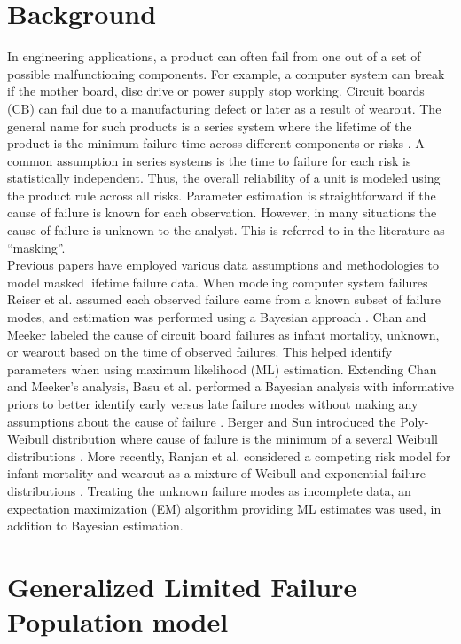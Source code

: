 \documentclass[12pt]{article}
\begin{document}
\section{Background}
\label{sec:Background}
In engineering applications, a product can often fail from one out of a set of possible malfunctioning components.  For example, a computer system can break if the mother board, disc drive or power supply stop working.  Circuit boards (CB) can fail due to a manufacturing defect or later as a result of wearout.  The general name for such products is a series system where the lifetime of the product is the minimum failure time across different components or risks \cite{nelson}.  A common assumption in series systems is the time to failure for each risk is statistically independent.  Thus, the overall reliability of a unit is modeled using the product rule across all risks.  Parameter estimation is straightforward if the cause of failure is known for each observation.  However, in many situations the cause of failure is unknown to the analyst. This is referred to in the literature as ``masking''.\\

Previous papers have employed various data assumptions and methodologies to model masked lifetime failure data.  When modeling computer system failures Reiser et al. assumed each observed failure came from a known subset of failure modes, and estimation was performed using a Bayesian approach \cite{reiser}.  Chan and Meeker labeled the cause of circuit board failures as infant mortality, unknown, or wearout based on the time of observed failures.  This helped identify parameters when using maximum likelihood (ML) estimation.  Extending Chan and Meeker's analysis, Basu et al. performed a Bayesian analysis with informative priors to better identify early versus late failure modes without making any assumptions about the cause of failure \cite{basu}.  Berger and Sun introduced the Poly-Weibull distribution where cause of failure is the minimum of a several Weibull distributions \cite{berger}.  More recently, Ranjan et al. considered a competing risk model for infant mortality and wearout as a mixture of Weibull and exponential failure distributions \cite{ranjan}.  Treating the unknown failure modes as incomplete data, an expectation maximization (EM) algorithm providing ML estimates was used, in addition to Bayesian estimation.


\section{Generalized Limited Failure Population model}
\label{sec:GLFP model}
\end{document}
